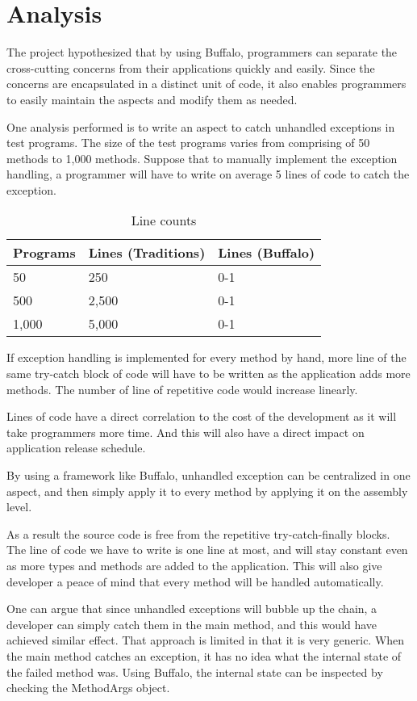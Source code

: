 \chapter{Analysis}

The project hypothesized that by using Buffalo, programmers can separate the cross-cutting concerns from their applications quickly and easily. Since the concerns are encapsulated in a distinct unit of code, it also enables programmers to easily maintain the aspects and modify them as needed.

One analysis performed is to write an aspect to catch unhandled exceptions in test programs. The size of the test programs varies from comprising of 50 methods to 1,000 methods. Suppose that to manually implement the exception handling, a programmer will have to write on average 5 lines of code to catch the exception.

\begin{table}[H]
\centering
\begin{tabular}{|l|l|l|}
\hline
Programs & Lines (Traditions) & Lines (Buffalo)\\
\hline
50 & 250 & 0-1\\
500 & 2,500 & 0-1\\
1,000 & 5,000 & 0-1\\
\hline
\end{tabular}
\caption{Line counts}
\label{tab:lines_tbl}
\end{table}

If exception handling is implemented for every method by hand, more line of the same try-catch block of code will have to be written as the application adds more methods. The number of line of repetitive code would increase linearly.

Lines of code have a direct correlation to the cost of the development as it will take programmers more time. And this will also have a direct impact on application release schedule.

By using a framework like Buffalo, unhandled exception can be centralized in one aspect, and then simply apply it to every method by applying it on the assembly level. 

As a result the source code is free from the repetitive try-catch-finally blocks. The line of code we have to write is one line at most, and will stay constant even as more types and methods are added to the application. This will also give developer a peace of mind that every method will be handled automatically.

One can argue that since unhandled exceptions will bubble up the chain, a developer can simply catch them in the main method, and this would have achieved similar effect. That approach is limited in that it is very generic. When the main method catches an exception, it has no idea what the internal state of the failed method was. Using Buffalo, the internal state can be inspected by checking the MethodArgs object. 

